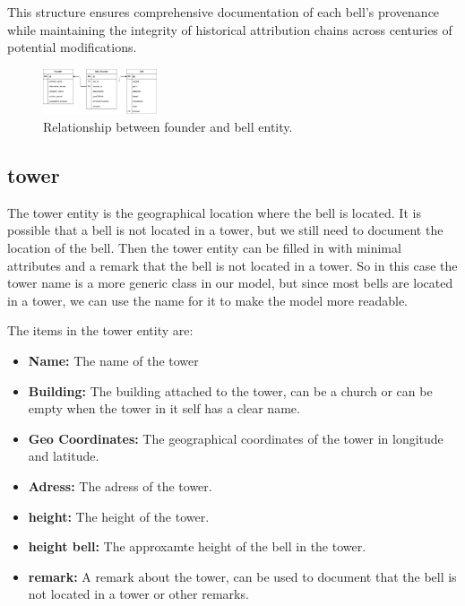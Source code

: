 \documentclass[11pt, a4paper]{article}
\begin{document}
This structure ensures comprehensive documentation of each bell's provenance while maintaining the integrity of historical attribution chains across centuries of potential modifications.

\begin{figure}[h!]
    \centering
    \includegraphics[width=0.3\textwidth]{images/founder_bell.png}
    \caption{Relationship between founder and bell entity.}
    \label{fig:founder_bell-relation}
\end{figure}


\subsection{tower}

The tower entity is the geographical location where the bell is located. It is possible that a bell is not located in a tower, but we still need to document the location of the bell. Then the tower entity can be filled in with minimal attributes and a remark that the bell is not located in a tower. So in this case the tower name is a more generic class in our model, but since most bells are located in a tower, we can use the name for it to make the model more readable.

The items in the tower entity are:

\begin{itemize}
    \item \textbf{Name:} The name of the tower
    \item \textbf{Building:} The building attached to the tower, can be a church or can be empty when the tower in it self has a clear name.
    \item \textbf{Geo Coordinates:} The geographical coordinates of the tower in longitude and latitude.
    \item \textbf{Adress:} The adress of the tower.
    \item \textbf{height:} The height of the tower.
    \item \textbf{height bell:} The approxamte height of the bell in the tower.
    \item \textbf{remark:} A remark about the tower, can be used to document that the bell is not located in a tower or other remarks.
\end{itemize}
\end{document}
